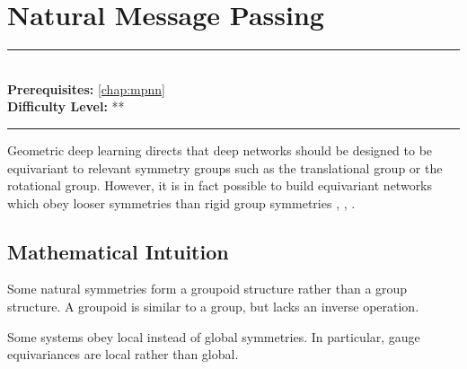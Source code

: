 \documentclass[book.tex]{subfiles}
\begin{document}
\chapter{Natural Message Passing}

\label{chap:natural_message}
\noindent\rule{11cm}{0.4pt} \\
\textbf{Prerequisites:} \autoref{chap:mpnn} \\
\textbf{Difficulty Level:} ** \\
\noindent\rule{11cm}{0.4pt}
\vspace{5mm}


Geometric deep learning directs that deep networks should be designed to be equivariant to relevant symmetry groups such as the translational group or the rotational group. However, it is in fact possible to build equivariant networks which obey looser symmetries than rigid group symmetries \cite{de2020gauge}, \cite{de2020natural}, \cite{suk2021mesh}. 

\section{Mathematical Intuition}

Some natural symmetries form a groupoid structure rather than a group structure. A groupoid is similar to a group, but lacks an inverse operation.

Some systems obey local instead of global symmetries. In particular, gauge equivariances are local rather than global. %
\end{document}
